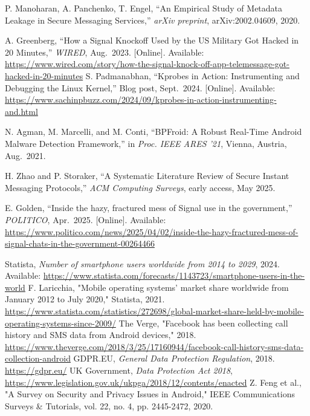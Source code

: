 \documentclass[a4paper,12pt]{report}
\begin{document}
\begin{thebibliography}{99}
P. Manoharan, A. Panchenko, T. Engel,
``An Empirical Study of Metadata Leakage in Secure Messaging Services,''
\emph{arXiv preprint}, arXiv:2002.04609, 2020.

A. Greenberg,
``How a Signal Knockoff Used by the US Military Got Hacked in 20 Minutes,''
\emph{WIRED}, Aug.\ 2023.
[Online]. Available: \url{https://www.wired.com/story/how-the-signal-knock-off-app-telemessage-got-hacked-in-20-minutes}
S. Padmanabhan, “Kprobes in Action: Instrumenting and Debugging the Linux Kernel,” Blog post, Sept.\ 2024.  [Online]. Available: \url{https://www.sachinpbuzz.com/2024/09/kprobes-in-action-instrumenting-and.html}

N. Agman, M. Marcelli, and M. Conti, “BPFroid: A Robust Real-Time Android Malware Detection Framework,” in \emph{Proc. IEEE ARES ’21}, Vienna, Austria, Aug.\ 2021.

H. Zhao and P. Storaker, “A Systematic Literature Review of Secure Instant Messaging Protocols,” \emph{ACM Computing Surveys}, early access, May 2025.

E. Golden, “Inside the hazy, fractured mess of Signal use in the government,” \emph{POLITICO}, Apr.\ 2025.  [Online]. Available: \url{https://www.politico.com/news/2025/04/02/inside-the-hazy-fractured-mess-of-signal-chats-in-the-government-00264466}

     Statista, \textit{Number of smartphone users worldwide from 2014 to 2029}, 2024. Available: \url{https://www.statista.com/forecasts/1143723/smartphone-users-in-the-world}
     F. Laricchia, "Mobile operating systems’ market share worldwide from January 2012 to July 2020," Statista, 2021. \url{https://www.statista.com/statistics/272698/global-market-share-held-by-mobile-operating-systems-since-2009/}
     The Verge, "Facebook has been collecting call history and SMS data from Android devices," 2018. \url{https://www.theverge.com/2018/3/25/17160944/facebook-call-history-sms-data-collection-android}
     GDPR.EU, \textit{General Data Protection Regulation}, 2018. \url{https://gdpr.eu/}
     UK Government, \textit{Data Protection Act 2018}, \url{https://www.legislation.gov.uk/ukpga/2018/12/contents/enacted}
     Z. Feng et al., "A Survey on Security and Privacy Issues in Android," IEEE Communications Surveys \& Tutorials, vol. 22, no. 4, pp. 2445-2472, 2020.


\end{thebibliography}
\end{document}
